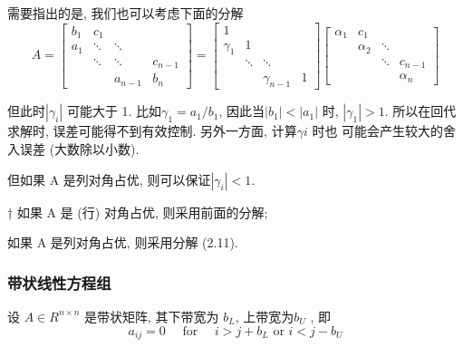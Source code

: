 \documentclass[12pt,a4paper]{article}
\begin{document}
需要指出的是, 我们也可以考虑下面的分解
\begin{equation}
A=\left[\begin{array}{cccc}{b_{1}} & {c_{1}} & {} & {} \\ {a_{1}} & {\ddots} & {\ddots} & {} \\ {} & {\ddots} & {\ddots} & {c_{n-1}} \\ {} & {} & {a_{n-1}} & {b_{n}}\end{array}\right]=\left[\begin{array}{ccccc}{1} \\ {\gamma_{1}} & {1} & {} & {} \\ {} & {\ddots} & {\ddots} & {} \\ {} & {} & {\gamma_{n-1}} & {1}\end{array}\right]\left[\begin{array}{cccc}{\alpha_{1}} & {c_{1}} & {} & {} \\ {} & {\alpha_{2}} & {\ddots} & {} \\ {} & {} & {\ddots} & {c_{n-1}} \\ {} & {} & {} & {\alpha_{n}}\end{array}\right]
\end{equation}

但此时$ |\gamma_i|$ 可能大于 1. 比如$ \gamma_1 = a_1/b_1$, 因此当$|b_1| < |a_1|$ 时, $|\gamma_1| > 1$.
所以在回代求解时, 误差可能得不到有效控制. 另外一方面, 计算$ γi$ 时也
可能会产生较大的舍入误差 (大数除以小数).

但如果 A 是列对角占优, 则可以保证$ |\gamma_i| < 1.$

\begin{framed}
† 如果 A 是 (行) 对角占优, 则采用前面的分解;
	
如果 A 是列对角占优, 则采用分解 (2.11).
\end{framed}

\subsubsection{带状线性方程组}
设 $A ∈ R^{n×n}$ 是带状矩阵, 其下带宽为 $b_L$, 上带宽为$b_U$ , 即
\begin{equation}
a_{i j}=0 \quad \text { for } \quad i>j+b_{L} \text { or } i<j-b_{U}
\end{equation}
\end{document}
